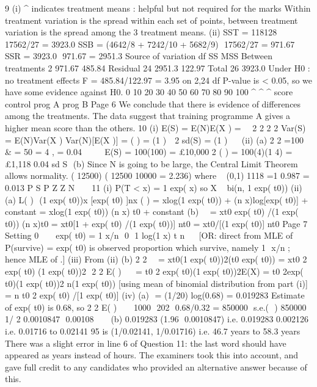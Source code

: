 \documentclass[a4paper,12pt]{article}
\begin{document}
9 (i)
^ indicates treatment means : helpful but not required for the marks
Within treatment variation is the spread within each set of points, between
treatment variation is the spread among the 3 treatment means.
(ii) SST = 118128  17562/27 = 3923.0
SSB = (4642/8 + 7242/10 + 5682/9)  17562/27 = 971.67
 SSR = 3923.0  971.67 = 2951.3
Source of variation df SS MSS
Between treatments 2 971.67 485.84
Residual 24 2951.3 122.97
Total 26 3923.0
Under H0 : no treatment effects F = 485.84/122.97 = 3.95 on 2,24 df
P-value is < 0.05, so we have some evidence against H0.
0 10 20 30 40 50 60 70 80 90 100
^
^
^
score
control
prog A
prog B
Page 6
We conclude that there is evidence of differences among the treatments. The
data suggest that training programme A gives a higher mean score than the
others.
10 (i) E(S) = E(N)E(X ) = 


2 2
2 2 Var(S) = E(N)Var(X ) Var(N)[E(X )] = ( ) = (1 )   
    
  
2
sd(S) = (1 )  


(ii) (a) 2
2 =100 & = 50 = 4 , = 0.04  
  
 
E(S) = 100(100) = £10,000
2
( ) = 100(4)(1 4) = £1,118
0.04
sd S 
(b) Since N is going to be large, the Central Limit Theorem allows
normality.
( 12500) ( 12500 10000 = 2.236) where ~ (0,1)
1118
=1 0.987 = 0.013
P S P Z Z N 
  

11 (i) P(T < x) = 1 	 exp(	
x) so X ~ bi(n, 1 	 exp(	
t0))
(ii) (a) L(
)  (1 	 exp(	
t0))x [exp(	
t0) ]nx
(
) = xlog(1 	 exp(	
t0)) + (n 	 x)log[exp(	
t0)] + constant
= xlog(1 	 exp(	
t0)) 	 (n 	 x)
t0 + constant
(b) 

 = xt0 exp(	
t0) /(1 	 exp(	
t0)) 	 (n 	 x)t0
= xt0[1 + exp(	
t0) /(1 	 exp(	
t0))] 	 nt0
= xt0/[(1 	 exp(	
t0)] 	 nt0
Page 7
Setting 0 


  exp(	
t0) = 1 	 x/n 
0
 1 log(1 x)
t n
   
[OR: direct from MLE of P(survive) = exp(	
t0) is observed
proportion which survive, namely 1  x/n ; hence MLE of 
.]
(iii) From (ii) (b)
2
2


 = 	xt0(1 	 exp(	
t0))2(t0 exp(	
t0))
= 	 xt0
2 exp(	
t0) (1 	exp(	
t0))2

2
2 E( ) 


 = t0
2 exp(	
t0)(1 	 exp(	
t0))2E(X)
= t0
2exp(	
t0)(1 	 exp(	
t0))2 n(1 	 exp(	
t0))
[using mean of binomial distribution from part (i)]
= n t0
2 exp(	
t0) /[1 	 exp(	
t0)]
(iv) (a)  = 	 (1/20) log(0.68) = 0.019283
Estimate of exp(	
t0) is 0.68,
so
2
2 E( ) 


  1000  202  0.68/0.32 = 850000
 s.e.(  ) 850000 1/ 2 0.0010847  0.00108     
(b) 0.019283 
 (1.96  0.0010847)
i.e. 0.019283 
 0.002126 i.e. 0.01716 to 0.02141
95%
 is (1/0.02141, 1/0.01716)
i.e. 46.7 years to 58.3 years
There was a slight error in line 6 of Question 11: the last word should have appeared as
years instead of hours. The examiners took this into account, and gave full credit to
any candidates who provided an alternative answer because of this.
\end{document}
